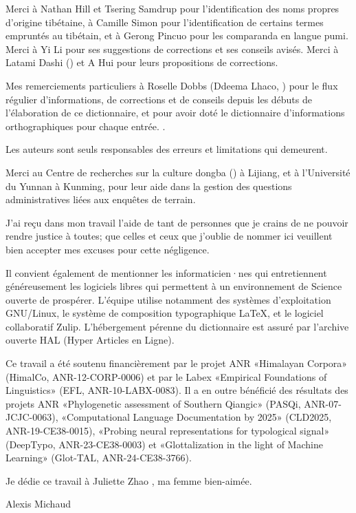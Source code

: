 Merci à Nathan Hill et Tsering Samdrup pour l'identification des noms propres d'origine tibétaine, à Camille Simon pour l'identification de certains termes empruntés au tibétain, et à Gerong Pincuo  pour les comparanda en langue pumi. Merci à Yi Li  pour ses suggestions de corrections et ses conseils avisés. Merci à Latami Dashi  () et A Hui  pour leurs propositions de corrections.

Mes remerciements particuliers à Roselle Dobbs (Ddeema Lhaco, ) pour le flux régulier d’informations, de corrections et de conseils depuis les débuts de l’élaboration de ce dictionnaire, et pour avoir doté le dictionnaire d'informations orthographiques pour chaque entrée.  \parencite[vi]{yliniemi_descriptive_2022}.

Les auteurs sont seuls responsables des erreurs et limitations qui demeurent.

Merci au Centre de recherches sur la culture dongba () à Lijiang, et à l’Université du Yunnan à Kunming, pour leur aide dans la gestion des questions administratives liées aux enquêtes de terrain.

J’ai reçu dans mon travail l’aide de tant de personnes que je crains de ne pouvoir rendre justice à toutes; que celles et ceux que j’oublie de nommer ici veuillent bien accepter mes excuses pour cette négligence.

Il convient également de mentionner les informaticien·nes qui entretiennent généreusement les logiciels libres qui permettent à un environnement de Science ouverte de prospérer. L'équipe utilise notamment des systèmes d'exploitation GNU/Linux, le système de composition typographique \LaTeX{}, et le logiciel collaboratif Zulip. L'hébergement pérenne du dictionnaire est assuré par l'archive ouverte HAL (Hyper Articles en Ligne).

Ce travail a été soutenu financièrement par le projet ANR «Himalayan Corpora» (HimalCo, ANR-12-CORP-0006) et par le Labex «Empirical Foundations of Linguistics» (EFL, ANR-10-LABX-0083). Il a en outre bénéficié des résultats des projets ANR «Phylogenetic assessment of Southern Qiangic» (PASQi, ANR-07-JCJC-0063), «Computational Language Documentation by 2025» (CLD2025, ANR-19-CE38-0015), «Probing neural representations for typological signal» (DeepTypo, ANR-23-CE38-0003) et «Glottalization in the light of Machine Learning» (Glot-TAL, ANR-24-CE38-3766).

Je dédie ce travail à Juliette Zhao , ma femme bien-aimée.

{\raggedleft Alexis Michaud\par}
